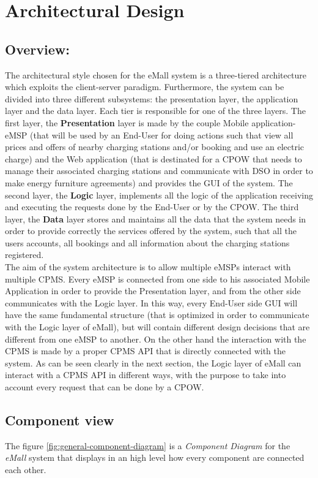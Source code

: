 \documentclass[a4paper]{report}
\begin{document}
\chapter{Architectural Design}
\section{Overview:}
The architectural style chosen for the eMall system is a three-tiered architecture which exploits the client-server paradigm. Furthermore, the system can be divided into three different subsystems: the presentation layer, the application layer and the data layer. Each tier is responsible for one of the three layers. The first layer, the \textbf{Presentation} layer is made by the couple Mobile application-eMSP (that will be used by an End-User for doing actions such that view all prices and offers of nearby charging stations and/or booking and use an electric charge) and the Web application (that is destinated for a CPOW that needs to manage their associated charging stations and communicate with DSO in order to make energy furniture agreements) and provides the GUI of the system. The second layer, the \textbf{Logic} layer, implements all the logic of the application receiving and executing the requests done by the End-User or by the CPOW. The third layer, the \textbf{Data} layer stores and maintains all the data that the system needs in order to provide correctly the services offered by the system, such that all the users accounts, all bookings and all information about the charging stations registered.\\
The aim of the system architecture is to allow multiple eMSPs interact with multiple CPMS. Every eMSP is connected from one side to his associated Mobile Application in order to provide the Presentation layer, and from the other side communicates with the Logic layer. In this way, every End-User side GUI will have the same fundamental structure (that is optimized in order to communicate with the Logic layer of eMall), but will contain different design decisions that are different from one eMSP to another.
On the other hand the interaction with the CPMS is made by a proper CPMS API that is directly connected with the system. As can be seen clearly in the next section, the Logic layer of eMall can interact with a CPMS API in different ways, with the purpose to take into account every request that can be done by a CPOW.




\section{Component view}
The figure \ref{fig:general-component-diagram} is a \textit{Component Diagram} for the \textit{eMall} system that displays in an high level how every component are connected each other.
\end{document}
